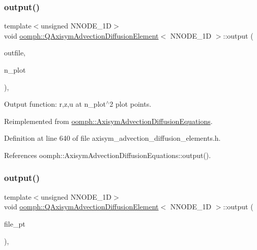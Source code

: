 \subsubsection{\texorpdfstring{output()}{output()}\hspace{0.1cm}{\footnotesize\ttfamily [2/4]}}
{\footnotesize\ttfamily template$<$unsigned N\+N\+O\+D\+E\+\_\+1D$>$ \\
void \hyperlink{classoomph_1_1QAxisymAdvectionDiffusionElement}{oomph\+::\+Q\+Axisym\+Advection\+Diffusion\+Element}$<$ N\+N\+O\+D\+E\+\_\+1D $>$\+::output (\begin{DoxyParamCaption}\item[{std\+::ostream \&}]{outfile,  }\item[{const unsigned \&}]{n\+\_\+plot }\end{DoxyParamCaption})\hspace{0.3cm}{\ttfamily [inline]}, {\ttfamily [virtual]}}



Output function\+: r,z,u at n\+\_\+plot$^\wedge$2 plot points. 



Reimplemented from \hyperlink{classoomph_1_1AxisymAdvectionDiffusionEquations_a37f231fce2fd5b8bbe51899469b2896b}{oomph\+::\+Axisym\+Advection\+Diffusion\+Equations}.



Definition at line 640 of file axisym\+\_\+advection\+\_\+diffusion\+\_\+elements.\+h.



References oomph\+::\+Axisym\+Advection\+Diffusion\+Equations\+::output().

\mbox{\label{classoomph_1_1QAxisymAdvectionDiffusionElement_ac095435d0ae6a5f3d74fa474d93906f8}} 
\subsubsection{\texorpdfstring{output()}{output()}\hspace{0.1cm}{\footnotesize\ttfamily [3/4]}}
{\footnotesize\ttfamily template$<$unsigned N\+N\+O\+D\+E\+\_\+1D$>$ \\
void \hyperlink{classoomph_1_1QAxisymAdvectionDiffusionElement}{oomph\+::\+Q\+Axisym\+Advection\+Diffusion\+Element}$<$ N\+N\+O\+D\+E\+\_\+1D $>$\+::output (\begin{DoxyParamCaption}\item[{F\+I\+LE $\ast$}]{file\+\_\+pt }\end{DoxyParamCaption})\hspace{0.3cm}{\ttfamily [inline]}, {\ttfamily [virtual]}}



